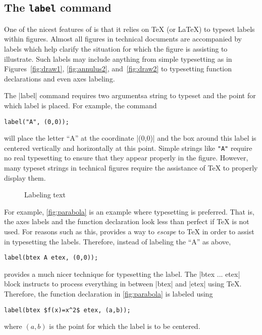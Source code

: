 \subsection{The \texttt{label} command}

One of the nicest features of \MP{} is that it relies on \TeX{} (or
\LaTeX) to typeset labels within figures.  Almost all figures in
technical documents are accompanied by labels which help clarify the
situation for which the figure is assisting to illustrate.  Such labels
may include anything from simple typesetting as in
Figures~\ref{fig:draw1}, \ref{fig:annulus2}, and~\ref{fig:draw2} to
typesetting function declarations and even axes labeling.

The |label| command requires two arguments\Dash a string to typeset and
the point for which label is placed.  For example, the command

\begin{lstlisting}[style=MP]
label("A", (0,0));
\end{lstlisting}
will place the letter ``A'' at the coordinate |(0,0)| and the box around
this label is centered vertically and horizontally at this point.
Simple strings like \lstinline[style=text]{"A"} require no real
typesetting to ensure that they appear properly in the figure.  However,
many typeset strings in technical figures require the assistance of
\TeX{} to properly display them.

\begin{figure}
  \centering
  \caption{Labeling text}
  \label{fig:parabola}
\end{figure}

For example, \autoref{fig:parabola} is an example where typesetting is
preferred.  That is, the axes labels and the function declaration look
less than perfect if \TeX{} is not used.  For reasons such as this,
\MP{} provides a way to \textit{escape} to \TeX{} in order to assist in
typesetting the labels.  Therefore, instead of labeling the ``A'' as
above,

\begin{lstlisting}[style=MP]
label(btex A etex, (0,0));
\end{lstlisting}
provides a much nicer technique for typesetting the label.  The
|btex ... etex| block instructs \MP{} to process everything in between
|btex| and |etex| using \TeX.  Therefore, the function declaration in
\autoref{fig:parabola} is labeled using

\begin{lstlisting}[style=MP]
label(btex $f(x)=x^2$ etex, (a,b));
\end{lstlisting}
where $(a,b)$ is the point for which the label is to be centered.

